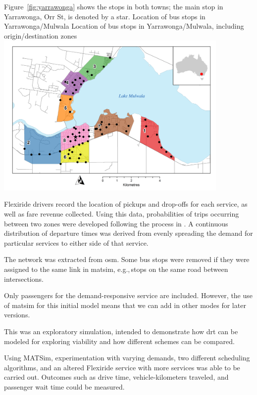 Figure~\ref{fig:yarrawonga} shows the stops in both towns; the main stop in Yarrawonga, Orr St, is denoted by a star.
%
\createfigure%
{Location of bus stops in Yarrawonga/Mulwala}%
{Location of bus stops in Yarrawonga/Mulwala, including origin/destination zones}%
{\label{fig:yarrawonga}}%
{\includegraphics[width=0.85\textwidth, angle=0]{./using/figures/yarrawonga_high.png}}%
{}
%

Flexiride drivers record the location of pickups and drop-offs for each service,
as well as fare revenue collected. Using this data, probabilities of trips
occurring between two zones were developed following the process in
\citet[][]{Deflorio_ITSIET_2011}. A continuous distribution of departure times was
derived from evenly spreading the demand for particular services to either side
of that service. 


The network was extracted from \gls{osm}. Some bus stops were removed if they were assigned to the same link in \gls{matsim}, e.g.,\,stops on the same road between intersections.

Only passengers for the demand-responsive service are included. However, the use of \gls{matsim} for this initial model means that we can add in other modes for later versions.


This was an exploratory simulation, intended to demonstrate how \gls{drt} can be modeled for exploring viability and how different schemes can be compared.

Using MATSim, experimentation with varying demands, two different scheduling
algorithms, and an altered Flexiride service with more services was able to be
carried out. Outcomes such as drive time, vehicle-kilometers traveled, and
passenger wait time could be measured.

